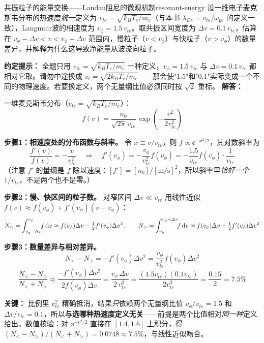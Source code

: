 \begin{example}{共振粒子的能量交换——Landau阻尼的微观机制}{resonant-energy}
设一维电子麦克斯韦分布的热速度\emph{统一}定义为 $v_{te} = \sqrt{k_{\!B}T_e/m_e}$（与本书 $\lambda_{De}=v_{te}/\omega_{pe}$ 的定义一致），Langmuir波的相速度为 $v_\phi = 1.5\,v_{te}$。取共振区间宽度为 $\Delta v = 0.1\,v_{te}$，估算在 $v_\phi - \Delta v < v < v_\phi + \Delta v$ 范围内，慢粒子（$v < v_\phi$）与快粒子（$v > v_\phi$）的数量差异，并解释为什么这导致净能量从波流向粒子。

\textbf{约定提示：} 全题只用 $v_{te}=\sqrt{k_{\!B}T_e/m_e}$ 一种定义，$v_\phi=1.5\,v_{te}$ 与 $\Delta v=0.1\,v_{te}$ 都相对它取。请勿中途换成 $v_t=\sqrt{2k_{\!B}T_e/m_e}$——那会使"1.5"和"0.1"实际变成一个不同的物理速度。若要换定义，两个无量纲比值必须同时按 $\sqrt2$ 重标。
\tcblower
\textbf{解答：}

一维麦克斯韦分布（$v_{te}=\sqrt{k_{\!B}T_e/m_e}$）：
\[
f(v) = \frac{n_0}{\sqrt{2\pi}\,v_{te}}\,\exp\!\left(-\frac{v^2}{2v_{te}^2}\right)
\]

\textbf{步骤1：相速度处的分布函数与斜率。} 令 $x\equiv v/v_{te}$，则 $f\propto\ee^{-x^2/2}$，其对数斜率为
\[
\frac{f'(v)}{f(v)} = -\frac{v}{v_{te}^2}
\quad\Rightarrow\quad
f'(v_\phi) = -\frac{v_\phi}{v_{te}^2}f(v_\phi) = -\frac{1.5}{v_{te}}f(v_\phi)\cdot\frac{1}{v_{te}}
\]
（注意 $f'$ 的量纲是 $f$ 除以速度：$[f']=[n_0]/[\mathrm{m/s}]^2$，所以斜率里\emph{恰好一个} $1/v_{te}$，不是两个也不是零。）

\textbf{步骤2：慢、快区间的粒子数。} 对窄区间 $\Delta v\ll v_{te}$ 用线性近似 $f(v)\approx f(v_\phi)+f'(v_\phi)(v-v_\phi)$：
\[
N_{<} = \int_{v_\phi-\Delta v}^{v_\phi}\!\! f\,\mathrm{d} v \approx f(v_\phi)\Delta v - \tfrac12 f'(v_\phi)\Delta v^2,
\qquad
N_{>} = \int_{v_\phi}^{v_\phi+\Delta v}\!\! f\,\mathrm{d} v \approx f(v_\phi)\Delta v + \tfrac12 f'(v_\phi)\Delta v^2
\]

\textbf{步骤3：数量差异与相对差异。}
\[
N_{<}-N_{>} = -f'(v_\phi)\Delta v^2 = \frac{v_\phi}{v_{te}^2}f(v_\phi)\Delta v^2
\]
\[
\frac{N_{<}-N_{>}}{N_{<}+N_{>}} \approx \frac{-f'(v_\phi)\Delta v^2}{2f(v_\phi)\Delta v}
= \frac{v_\phi\,\Delta v}{2\,v_{te}^2}
= \frac{(1.5v_{te})(0.1v_{te})}{2v_{te}^2}
= \frac{0.15}{2} = \boxed{7.5\%}
\]

\textbf{关键：} 比例里 $v_{te}^2$ 精确抵消，结果\emph{只}依赖两个无量纲比值 $v_\phi/v_{te}=1.5$ 和 $\Delta v/v_{te}=0.1$，所以\textbf{与选哪种热速度定义无关}——前提是两个比值相对\emph{同一种}定义给出。数值核验：对 $\ee^{-v^2/2}$ 直接在 $[1.4,1.6]$ 上积分，得 $(N_<-N_>)/(N_<+N_>)=0.0748\approx7.5\%$，与线性近似吻合。


\end{example}

